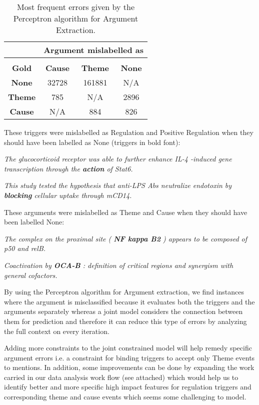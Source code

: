 \documentclass{article} %
\begin{document}
\begin{table}[!htbp]
\caption{Most frequent errors given by the Perceptron algorithm for Argument Extraction.}
\label{table:Error2}
\begin{center}
\begin{tabular}{c c c c}
\multicolumn{1}{c}{} & \multicolumn{3}{c}{\bf Argument mislabelled as}
\\ \hline \\
\textbf{Gold}  & \textbf{Cause} & \textbf{Theme} & \textbf{None}\\
\textbf{None}  & 32728 & 161881 & N/A\\
\textbf{Theme} & 785 & N/A & 2896\\
\textbf{Cause} & N/A & 884 & 826\\

\end{tabular}
\end{center}
\end{table}

These triggers were mislabelled as Regulation and Positive Regulation when they should have been labelled as None (triggers in bold font):


\textit{The glucocorticoid receptor was able to further enhance IL-4 -induced gene transcription through the \textbf{action} of Stat6.}

\textit{This study tested the hypothesis that anti-LPS Abs neutralize endotoxin by \textbf{blocking} cellular uptake through mCD14.}
 
These arguments were mislabelled as Theme and Cause when they should have been labelled None:

\textit{The complex on the proximal site ( \textbf{NF kappa B2} ) appears to be composed of p50 and relB.}

\textit{Coactivation by \textbf{OCA-B} : definition of critical regions and synergism with general cofactors.}

By using the Perceptron algorithm for Argument extraction, we find instances where the argument is misclassified because it evaluates both the triggers and the arguments separately whereas a joint model considers the connection between them for prediction and therefore it can reduce this type of errors by analyzing the full context on every iteration. 

Adding more constraints to the joint constrained model will help remedy specific argument errors i.e. a constraint for binding triggers to accept only Theme events to mentions. In addition, some improvements can be done by expanding the work carried in our data analysis work flow (see attached) which would help us to identify better and more specific high impact features for regulation triggers and corresponding theme and cause events which seems some challenging to model.
\end{document}
